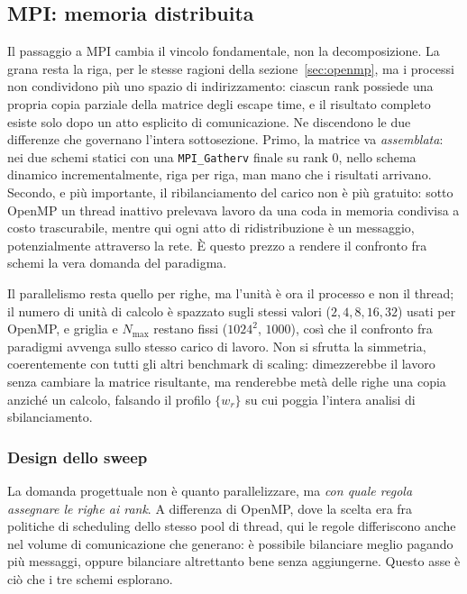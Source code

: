 \subsection{MPI: memoria distribuita}
\label{sec:mpi}

Il passaggio a MPI cambia il vincolo fondamentale, non la decomposizione. La
grana resta la riga, per le stesse ragioni della sezione~\ref{sec:openmp}, ma i
processi non condividono più uno spazio di indirizzamento: ciascun rank possiede
una propria copia parziale della matrice degli escape time, e il risultato
completo esiste solo dopo un atto esplicito di comunicazione. Ne discendono le
due differenze che governano l'intera sottosezione. Primo, la matrice va
\emph{assemblata}: nei due schemi statici con una \texttt{MPI\_Gatherv} finale
su rank $0$, nello schema dinamico incrementalmente, riga per riga, man mano che
i risultati arrivano. Secondo, e più importante, il ribilanciamento del carico
non è più gratuito: sotto OpenMP un thread inattivo prelevava lavoro da una coda
in memoria condivisa a costo trascurabile, mentre qui ogni atto di
ridistribuzione è un messaggio, potenzialmente attraverso la rete. È questo
prezzo a rendere il confronto fra schemi la vera domanda del paradigma.

Il parallelismo resta quello per righe, ma l'unità è ora il processo e non il
thread; il numero di unità di calcolo è spazzato sugli stessi valori
($2, 4, 8, 16, 32$) usati per OpenMP, e griglia e $N_{\max}$ restano fissi
($1024^2$, $1000$), così che il confronto fra paradigmi avvenga sullo stesso
carico di lavoro. Non si sfrutta la simmetria, coerentemente con tutti gli altri
benchmark di scaling: dimezzerebbe il lavoro senza cambiare la matrice
risultante, ma renderebbe metà delle righe una copia anziché un calcolo,
falsando il profilo $\{w_r\}$ su cui poggia l'intera analisi di sbilanciamento.

\subsubsection{Design dello sweep}
\label{sec:mpi-sweep}

La domanda progettuale non è quanto parallelizzare, ma \emph{con quale regola
assegnare le righe ai rank}. A differenza di OpenMP, dove la scelta era fra
politiche di scheduling dello stesso pool di thread, qui le regole differiscono
anche nel volume di comunicazione che generano: è possibile bilanciare meglio
pagando più messaggi, oppure bilanciare altrettanto bene senza aggiungerne.
Questo asse è ciò che i tre schemi esplorano.


